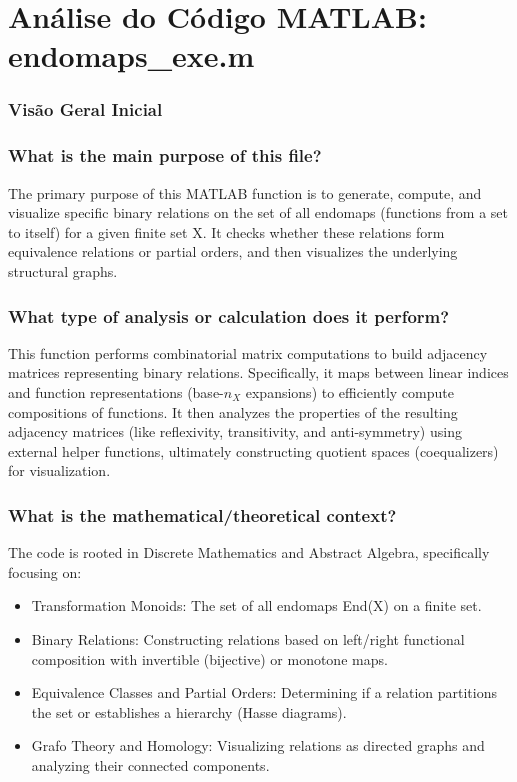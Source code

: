 
\chapter{Análise do Código MATLAB: endomaps\_exe.m}

\subsection*{Visão Geral Inicial}
\subsection* { \hspace*{0.2cm} What is the main purpose of this file?}
The primary purpose of this MATLAB function is to generate, compute, and visualize specific binary relations on the set of all endomaps (functions from a set to itself) for a given finite set X. It checks whether these relations form equivalence relations or partial orders, and then visualizes the underlying structural graphs.


\subsection*{ \hspace*{0.2cm} What type of analysis or calculation does it perform?}
This function performs combinatorial matrix computations to build adjacency matrices representing binary relations. Specifically, it maps between linear indices and function representations  (base-$n_X$ expansions) to efficiently compute compositions of functions. It then analyzes the properties of the resulting adjacency matrices (like reflexivity, transitivity, and anti-symmetry) using external helper functions, ultimately constructing quotient spaces (coequalizers) for visualization.

\subsection*{ \hspace*{0.2cm} What is the mathematical/theoretical context?}
The code is rooted in Discrete Mathematics and Abstract Algebra, specifically focusing on: 
\begin{itemize}
    \item Transformation Monoids: The set of all endomaps End(X) on a finite set.
\end{itemize}
\begin{itemize}
    \item Binary Relations: Constructing relations based on left/right functional composition with invertible (bijective) or monotone maps.
    \item Equivalence Classes and Partial Orders: Determining if a relation partitions the set or establishes a hierarchy (Hasse diagrams).
\end{itemize}
\begin{itemize}
    \item Grafo Theory and Homology: Visualizing relations as directed graphs and analyzing their connected components.
\end{itemize}


